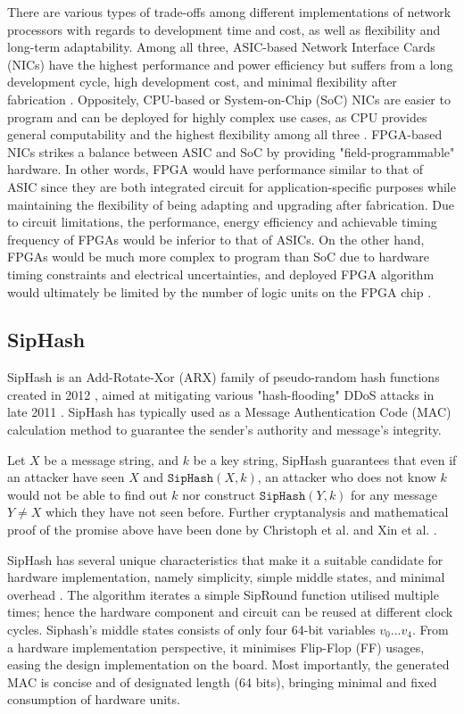 \documentclass[a4paper]{report}
\newcommand{\code}{\texttt}
\begin{document}
There are various types of trade-offs among different implementations of network processors with regards to development time and cost, as well as flexibility and long-term adaptability. Among all three, ASIC-based Network Interface Cards (NICs) have the highest performance and power efficiency but suffers from a long development cycle, high development cost, and minimal flexibility after fabrication \cite{amara-2006, deierling-2018}. Oppositely, CPU-based or System-on-Chip (SoC) NICs are easier to program and can be deployed for highly complex use cases, as CPU provides general computability and the highest flexibility among all three \cite{deierling-2018}. FPGA-based NICs strikes a balance between ASIC and SoC by providing "field-programmable" hardware. In other words, FPGA would have performance similar to that of ASIC since they are both integrated circuit for application-specific purposes while maintaining the flexibility of being adapting and upgrading after fabrication. Due to circuit limitations, the performance, energy efficiency and achievable timing frequency of FPGAs would be inferior to that of ASICs. On the other hand, FPGAs would be much more complex to program than SoC due to hardware timing constraints and electrical uncertainties, and deployed FPGA algorithm would ultimately be limited by the number of logic units on the FPGA chip \cite{deierling-2018}.

\subsection{SipHash}
\label{section:background-siphash}

SipHash is an Add-Rotate-Xor (ARX) family of pseudo-random hash functions created in 2012 \cite{aumasson-bernstein-2012}, aimed at mitigating various "hash-flooding" DDoS attacks in late 2011 \cite{lennon-2011}. SipHash has typically used as a Message Authentication Code (MAC) calculation method to guarantee the sender's authority and message's integrity. 

Let $X$ be a message string, and $k$ be a key string, SipHash guarantees that even if an attacker have seen $X$ and $\code{SipHash}(X, k)$, an attacker who does not know $k$ would not be able to find out $k$ nor construct $\code{SipHash}(Y, k)$ for any message $Y \neq X$ which they have not seen before. Further cryptanalysis and mathematical proof of the promise above have been done by Christoph et al. \cite{dobraunig-2014} and Xin et al. \cite{xin-2019}.

SipHash has several unique characteristics that make it a suitable candidate for hardware implementation, namely simplicity, simple middle states, and minimal overhead \cite{aumasson-bernstein-2012}. The algorithm iterates a simple SipRound function utilised multiple times; hence the hardware component and circuit can be reused at different clock cycles. Siphash's middle states consists of only four 64-bit variables $v_0 ... v_4$. From a hardware implementation perspective, it minimises Flip-Flop (FF) usages, easing the design implementation on the board. Most importantly, the generated MAC is concise and of designated length (64 bits), bringing minimal and fixed consumption of hardware units.
\end{document}
